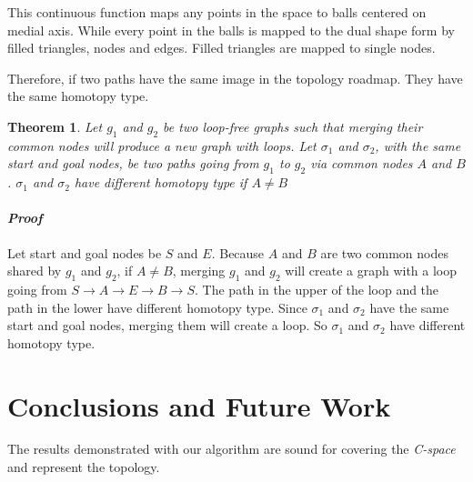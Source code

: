 \documentclass[11pt]{article}
\newtheorem{theorem}{Theorem}[section]
\begin{document}
  \indent This continuous function maps any points in the space to balls centered on medial axis. While every point in the balls is mapped to the dual shape form by filled triangles, nodes and edges. Filled triangles are mapped to single nodes.   
  
  \indent Therefore, if two paths have the same image in the topology roadmap. They have the same homotopy type.
  
  \begin{theorem}
  Let $g_1$ and $g_2$ be two loop-free graphs such that merging their common nodes will produce a new graph with loops. Let $\sigma_1$ and $\sigma_2$, with the same start and goal nodes, be two paths going from $g_1$ to $g_2$ via common nodes $A$ and $B$. $\sigma_1$ and $\sigma_2$ have different homotopy type if $A \neq B$
  \end{theorem}
  \paragraph{\emph{Proof}}
  \indent Let start and goal nodes be $S$ and $E$. Because $A$ and $B$ are two common nodes shared by $g_1$ and $g_2$, if $A \neq B$, merging $g_1$ and $g_2$ will create a graph with a loop going from $S \rightarrow A \rightarrow E \rightarrow B \rightarrow S$. The path in the upper of the loop and the path in the lower have different homotopy type. Since $\sigma_1$ and $\sigma_2$ have the same start and goal nodes, merging them will create a loop. So $\sigma_1$ and $\sigma_2$ have different homotopy type.

%

%
\section{Conclusions and Future Work}\label{conclusions}
\indent\indent The results demonstrated with our algorithm are sound for covering the \emph{C-space} and represent the topology.  
\end{document}

